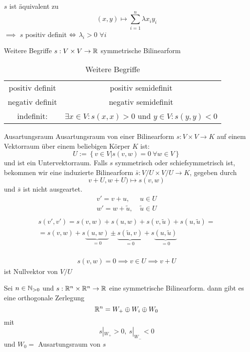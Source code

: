 \begin{Bew}
  $s$ ist äquivalent zu 
  \[(x,y)\mapsto\sum^n_{i=1}\lambda x_iy_i\]
  $\implies$ $s$ positiv definit $\Leftrightarrow$ $\lambda_i >0$ $\forall i$
\end{Bew}
\begin{Bem}{Weitere Begriffe}
  $s:V\times V\to\mathbb{R}$ symmetrische Bilinearform
 \begin{table}[htb]
   \centering
   \begin{tabular}{cc}
     positiv definit & positiv semidefinit \\
     negativ definit & negativ semidefinit \\
     indefinit: & $\exists x\in V: s(x,x)> 0$ und $y\in V: s(y,y)<0$
   \end{tabular}
   \caption{Weitere Begriffe}
 \end{table}
\end{Bem}
\begin{Bem}{Ausartungsraum}
  Ausartungsraum von einer Bilinearform $s:V\times V\to K$ auf einem Vektorraum über einem beliebigen Körper $K$ ist:  
  \[U:=\left\{ v\in V|s(v,w)=0\ \forall w\in V \right\}\]
  und ist ein Untervektorraum. Falls $s$ symmetrisch oder schiefsymmetrisch ist, bekommen wir eine induzierte Bilinearform $\bar s:V/U\times V/U\to K$, gegeben durch
  \[v+U,w+U)\mapsto s(v,w)\]
  und $\bar s$ ist nicht ausgeartet.
  \begin{align*}
    v'=v+u, &\ u\in U\\
    w'=w+\tilde u, &\ \tilde u \in U\\
  \end{align*}
  \begin{gather*}
    s(v',v')=s(v,w)+s(u,w)+s(v,\tilde u)+s(u, \tilde u)=\\
    =s(v,w)+s\underbrace{(u,w)}_{=0} \pm \underbrace{s(\tilde u,v)}_{=0}+s\underbrace{(u,\tilde u)}_{=0}
  \end{gather*}
  \\
  \begin{gather*}
    s(v,w)=0 \implies v\in U \implies v+U
  \end{gather*}
  ist Nullvektor von $V/U$
\end{Bem}
\begin{Kor}
  Sei $n\in\mathbb{N}_{>0}$ und $s:\mathbb{R}^n\times\mathbb{R}^n\to\mathbb{R}$ eine symmetrische Bilinearform. dann gibt es eine orthogonale Zerlegung
  \[\mathbb{R}^n=W_+\oplus W_i\oplus W_0\]
  mit
  \[s|_{W_+}>0,\ s|_{W_-}<0\]
  und $W_0=$ Ausartungsraum von $s$
\end{Kor}
